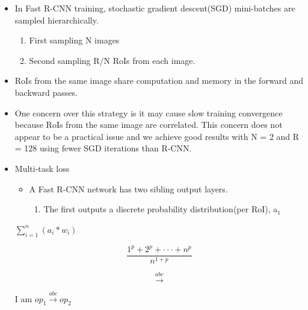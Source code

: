 \documentclass[11pt]{article}
\begin{document}
\begin{itemize}
\item In Fast R-CNN training, stochastic gradient descent(SGD) mini-batches are sampled 
      hierarchically.
\begin{enumerate}
\item First sampling N images
\item Second sampling R/N RoIs from each image.
\end{enumerate}
\item RoIs from the same image share computation and memory in the forward and backward
      passes.
\item One concern over this strategy is it may cause slow training convergence because
      RoIs from the same image are correlated. This concern does not appear to be a 
      practical issue and we achieve good results with N = 2 and R = 128 using fewer
      SGD iterations than R-CNN.
\end{itemize}
\begin{itemize}

\item Multi-task loss\\
\label{sec-1-1-3-1}%
\begin{itemize}
\item A Fast R-CNN network has two sibling output layers.
\begin{enumerate}
\item The first outputs a discrete probability distribution(per RoI), 
          a$_{1}$
\end{enumerate}
\end{itemize}


            \(\sum\limits_{i=1}^n(a_i*w_i)\)


          \begin{equation}
            \frac{1^p+2^p+\cdot\cdot\cdot+n^p}{n^{1+p}}
          \end{equation}
          
          \begin{equation}
            \stackrel{abc}{\longrightarrow}
          \end{equation}

          I am $op_1\stackrel{abc}{\longrightarrow}op_2$ 


          
          
\end{itemize} %
\end{document}
